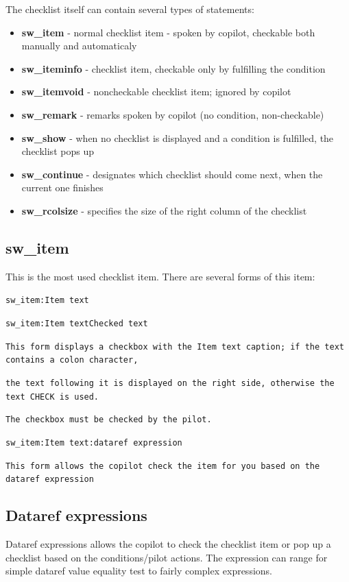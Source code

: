 \documentclass[11pt,parskip=half,a4paper]{scrartcl}
\newcommand\textstyleStrongEmphasis[1]{\textbf{#1}}
\newcommand\textstyleSourceText[1]{\texttt{#1}}
\begin{document}
The checklist itself can contain several types of statements:

\begin{itemize}
\item \textstyleStrongEmphasis{sw\_item} - normal checklist item - spoken by copilot, checkable both manually and automaticaly 
\item \textstyleStrongEmphasis{sw\_iteminfo} - checklist item, checkable only by fulfilling the condition 
\item \textstyleStrongEmphasis{sw\_itemvoid} - noncheckable checklist item; ignored by copilot 
\item \textstyleStrongEmphasis{sw\_remark} - remarks spoken by copilot (no condition, non-checkable) 
\item \textstyleStrongEmphasis{sw\_show} - when no checklist is displayed and a condition is fulfilled, the checklist pops up 
\item \textstyleStrongEmphasis{sw\_continue} - designates which checklist should come next, when the current one
finishes 
\item \textstyleStrongEmphasis{sw\_rcolsize} - specifies the size of the {\textquotedbl}right column{\textquotedbl} of the checklist 
\end{itemize}
\subsection{sw\_item}
This is the most used checklist item. There are several forms of this item:

\textstyleSourceText{sw\_item:Item text}

\textstyleSourceText{sw\_item:Item text{\textbar}Checked text}

{\ttfamily
\textstyleSourceText{This form displays a checkbox with the {\textquotedbl}Item text{\textquotedbl} caption; if the text contains a colon character,}}

{\ttfamily
\textstyleSourceText{the text following it is displayed on the right side, otherwise the text
{\textquotedbl}CHECK{\textquotedbl} is used.}}

{\ttfamily
\textstyleSourceText{The checkbox must be checked by the pilot.}}

\textstyleSourceText{sw\_item:Item text:dataref expression}

{\ttfamily
\textstyleSourceText{This form allows the {\textquotedbl}copilot{\textquotedbl} check the item for you based on the dataref expression}}

\subsection[Dataref expressions]{Dataref expressions}
Dataref expressions allows the {\textquotedbl}copilot{\textquotedbl} to check the checklist item or pop up a checklist based on the conditions/pilot actions. The expression can range for simple dataref value equality test to fairly complex expressions.
\end{document}
